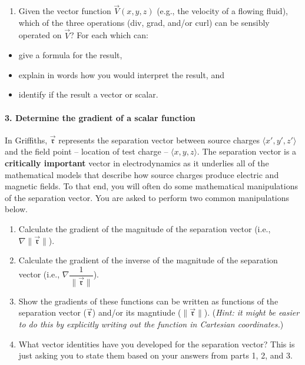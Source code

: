 \documentclass[
  letterpaperpaper,
]{article}
\providecommand{\tightlist}{%
  \setlength{\itemsep}{0pt}\setlength{\parskip}{0pt}}
\begin{document}
\begin{enumerate}
\def\labelenumi{\arabic{enumi}.}
\setcounter{enumi}{1}
\tightlist
\item
  Given the vector function \(\vec{V}(x,y,z)\) (e.g., the velocity of a
  flowing fluid), which of the three operations (div, grad, and/or curl)
  can be sensibly operated on \(\vec{V}\)? For each which can:
\end{enumerate}

\begin{itemize}
\tightlist
\item
  give a formula for the result,
\item
  explain in words how you would interpret the result, and
\item
  identify if the result a vector or scalar.
\end{itemize}

\hypertarget{determine-the-gradient-of-a-scalar-function}{%
\paragraph{3. Determine the gradient of a scalar
function}\label{determine-the-gradient-of-a-scalar-function}}

In Griffiths, \(\vec{\mathfrak{r}}\) represents the separation vector
between source charges \(\langle x', y', z' \rangle\) and the field
point -- location of test charge -- \(\langle x, y, z \rangle\). The
separation vector is a \textbf{critically important} vector in
electrodynamics as it underlies all of the mathematical models that
describe how source charges produce electric and magnetic fields. To
that end, you will often do some mathematical manipulations of the
separation vector. You are asked to perform two common manipulations
below.

\begin{enumerate}
\def\labelenumi{\arabic{enumi}.}
\tightlist
\item
  Calculate the gradient of the magnitude of the separation vector
  (i.e., \(\nabla\|\vec{\mathfrak{r}}\|\)).
\item
  Calculate the gradient of the inverse of the magnitude of the
  separation vector (i.e.,
  \(\nabla \dfrac{1}{\|\vec{\mathfrak{r}}\|}\)).
\item
  Show the gradients of these functions can be written as functions of
  the separation vector (\(\vec{\mathfrak{r}}\)) and/or its magntiude
  (\(\|\vec{\mathfrak{r}}\|\)). (\emph{Hint: it might be easier to do
  this by explicitly writing out the function in Cartesian
  coordinates.})
\item
  What vector identities have you developed for the separation vector?
  This is just asking you to state them based on your answers from parts
  1, 2, and 3.
\end{enumerate}
\end{document}
